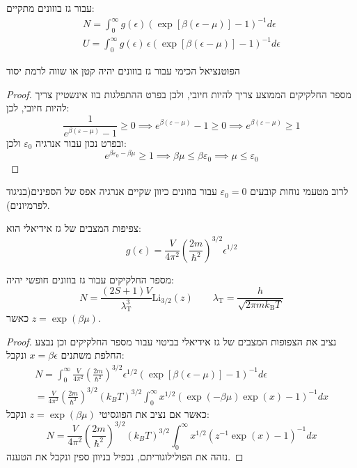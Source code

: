 \documentclass{tstextbook}
\begin{document}
\begin{reminder}
עבור גז בוזונים מתקיים:
\begin{gather*}{N=\int_{0}^{\infty}g\left( \epsilon \right)\left(\exp\left[ \beta\left( \epsilon-\mu \right) \right]-1\right)^{-1}d\epsilon}\\  {U=\int_{0}^{\infty}g\left( \epsilon \right)\,\epsilon\left(\exp\left[ \beta\left( \epsilon-\mu \right) \right]-1\right)^{-1}d\epsilon} 
\end{gather*}

\end{reminder}
\begin{proposition}
הפוטנציאל הכימי עבור גז בוזונים יהיה קטן או שווה לרמת יסוד

\end{proposition}
\begin{proof}
מספר החלקיקים הממוצע צריך להיות חיובי, ולכן בפרט ההתפלגות בוז אינשטיין צריך להיות חיובי, לכן:
$$\frac{1}{e^{ \beta\left( \varepsilon-\mu \right) }-1}\geq 0\implies e^{ \beta\left( \varepsilon-\mu \right) }-1\geq 0\implies e^{ \beta\left( \varepsilon-\mu \right) }\geq 1$$
ובפרט נכון עבור אנרגיה \(\varepsilon_{0}\) ולכן:
$$e^{ \beta\varepsilon_{0}-\beta \mu }\geq 1\implies \beta \mu \leq \beta\varepsilon_{0}\implies \mu\leq\varepsilon_{0}$$

\end{proof}
\begin{remark}
לרוב מטעמי נוחות קובעים \(\varepsilon_{0}=0\) עבור בוזונים כיוון שקיים אנרגיה אפס של הספינים(בניגוד לפרמיונים).

\end{remark}
\begin{reminder}
צפיפות המצבים של גז אידיאלי הוא:
$$g\left( \epsilon \right)=\frac{V}{4\pi^{2}}\left(\frac{2m}{\hbar^{2}}\right)^{3/2}\epsilon^{1/2}$$

\end{reminder}
\begin{proposition}
מספר החלקיקים עבור גז בוזונים חופשי יהיה:
$$N=\frac{(2S+1)V}{\lambda_{\mathrm{T}}^{3}}\mathrm{Li}_{3/2}(z)\qquad \lambda_{\mathrm{T}}=\frac{h}{\sqrt{2\pi m k_{\mathrm{B}}T}}$$
כאשר \(z=\exp\left( \beta \mu \right)\).

\end{proposition}
\begin{proof}
נציב את הצפופות המצבים של גז אידיאלי בביטוי עבור מספר החלקיקים וכן נבצע החלפת משתנים \(x=\beta\epsilon\) ונקבל:
\begin{gather*}N=\int_{0}^{\infty}\frac{V}{4\pi^{2}}\left(\frac{2m}{\hbar^{2}}\right)^{3/2}\epsilon^{1/2}\left(\exp\left[ \beta\left( \epsilon-\mu \right) \right]-1\right)^{-1}d\epsilon\\={\frac{V}{4\pi^{2}}}\left({\frac{2m}{\hbar^{2}}}\right)^{3/2}(k_{B}T)^{3/2}\int_{0}^{\infty}x^{1/2}\left(\exp\left( -\beta\mu \right)\exp(x)-1\right)^{-1}d x 
\end{gather*}
כאשר אם נציב את הפוגסיטי \(z=\exp\left( \beta \mu \right)\) ונקבל:
$$N=\frac{V}{4\pi^{2}}\left(\frac{2m}{\hbar^{2}}\right)^{3/2}\left(k_{B}T\right)^{3/2}\int_{0}^{\infty}x^{1/2}\left(z^{-1}\exp(x)-1\right)^{-1}d x$$
נזהה את הפולילוגוריתם, נכפיל בניוון ספין ונקבל את הטענה.

\end{proof}
\end{document}

